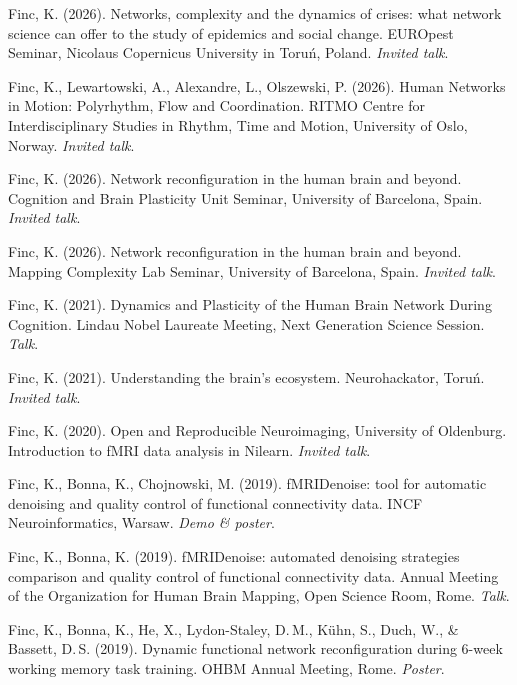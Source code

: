 \documentclass[10pt, a4paper]{article}
\newenvironment{cvlist}{%
  \begin{enumerate}[leftmargin=2em, label={[\arabic*]}, itemsep=0.25em, parsep=0pt]%
}{%
  \end{enumerate}%
}
\begin{document}
\begin{cvlist}

\item Finc, K. (2026). Networks, complexity and the dynamics of crises: what network science can offer to the study of epidemics and social change. EUROpest Seminar, Nicolaus Copernicus University in Toru\'n, Poland. \textit{Invited talk}.

\item Finc, K., Lewartowski, A., Alexandre, L., Olszewski, P. (2026). Human Networks in Motion: Polyrhythm, Flow and Coordination. RITMO Centre for Interdisciplinary Studies in Rhythm, Time and Motion, University of Oslo, Norway. \textit{Invited talk}.

\item Finc, K. (2026). Network reconfiguration in the human brain and beyond. Cognition and Brain Plasticity Unit Seminar, University of Barcelona, Spain. \textit{Invited talk}.

\item Finc, K. (2026). Network reconfiguration in the human brain and beyond. Mapping Complexity Lab Seminar, University of Barcelona, Spain. \textit{Invited talk}.

\item Finc, K. (2021). Dynamics and Plasticity of the Human Brain Network During Cognition. Lindau Nobel Laureate Meeting, Next Generation Science Session. \textit{Talk}.

\item Finc, K. (2021). Understanding the brain's ecosystem. Neurohackator, Toru\'n. \textit{Invited talk}.

\item Finc, K. (2020). Open and Reproducible Neuroimaging, University of Oldenburg. Introduction to fMRI data analysis in Nilearn. \textit{Invited talk}.

\item Finc, K., Bonna, K., Chojnowski, M. (2019). fMRIDenoise: tool for automatic denoising and quality control of functional connectivity data. INCF Neuroinformatics, Warsaw. \textit{Demo \& poster}.

\item Finc, K., Bonna, K. (2019). fMRIDenoise: automated denoising strategies comparison and quality control of functional connectivity data. Annual Meeting of the Organization for Human Brain Mapping, Open Science Room, Rome. \textit{Talk}.

\item Finc, K., Bonna, K., He, X., Lydon-Staley, D.\,M., K\"uhn, S., Duch, W., \& Bassett, D.\,S. (2019). Dynamic functional network reconfiguration during 6-week working memory task training. OHBM Annual Meeting, Rome. \textit{Poster}.


\end{cvlist}
\end{document}
